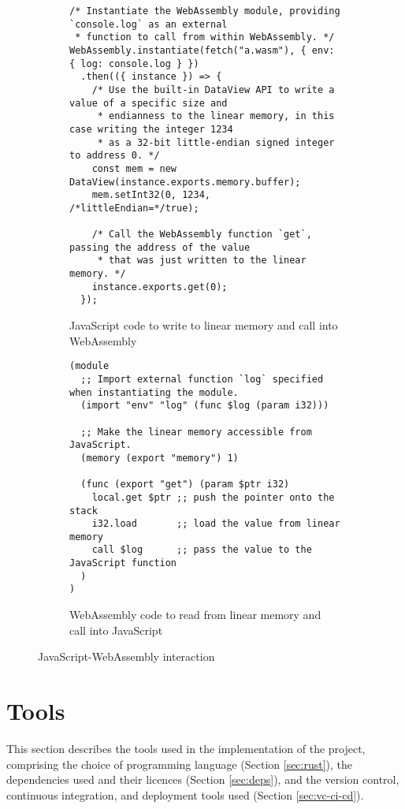 \begin{figure}[H]
\centering
\begin{subfigure}{\textwidth}
\begin{verbatim}
/* Instantiate the WebAssembly module, providing `console.log` as an external
 * function to call from within WebAssembly. */
WebAssembly.instantiate(fetch("a.wasm"), { env: { log: console.log } })
  .then(({ instance }) => {
    /* Use the built-in DataView API to write a value of a specific size and
     * endianness to the linear memory, in this case writing the integer 1234
     * as a 32-bit little-endian signed integer to address 0. */
    const mem = new DataView(instance.exports.memory.buffer);
    mem.setInt32(0, 1234, /*littleEndian=*/true);

    /* Call the WebAssembly function `get`, passing the address of the value
     * that was just written to the linear memory. */
    instance.exports.get(0);
  });
\end{verbatim}
\caption{JavaScript code to write to linear memory and call into WebAssembly}
\end{subfigure}
\par\bigskip
\par\bigskip
\begin{subfigure}{\textwidth}
\begin{verbatim}
(module
  ;; Import external function `log` specified when instantiating the module.
  (import "env" "log" (func $log (param i32)))

  ;; Make the linear memory accessible from JavaScript.
  (memory (export "memory") 1)

  (func (export "get") (param $ptr i32)
    local.get $ptr ;; push the pointer onto the stack
    i32.load       ;; load the value from linear memory
    call $log      ;; pass the value to the JavaScript function
  )
)
\end{verbatim}
\caption{WebAssembly code to read from linear memory and call into JavaScript}
\end{subfigure}
\caption{JavaScript-WebAssembly interaction}
\label{fig:js-wasm}
\end{figure}

\section{Tools}

\label{sec:tools}

This section describes the tools used in the implementation of the project, comprising the choice of programming language (Section \ref{sec:rust}), the dependencies used and their licences (Section \ref{sec:deps}), and the version control, continuous integration, and deployment tools used (Section \ref{sec:vc-ci-cd}).

